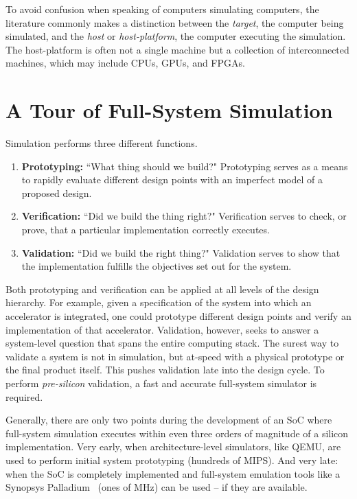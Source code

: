 To avoid confusion when speaking of computers simulating computers, the
literature commonly makes a distinction between the \emph{target}, the computer
being simulated, and the \emph{host} or \emph{host-platform}, the computer
executing the simulation. The host-platform is often not a single machine but
a collection of interconnected machines, which may include CPUs,
GPUs, and FPGAs.

\section{A Tour of Full-System Simulation}

Simulation performs three different functions.

\begin{enumerate}

    \item \textbf{Prototyping:} ``What thing should we
        build?" Prototyping serves as a means to rapidly evaluate different
        design points with an imperfect model of a proposed design.

    \item \textbf{Verification:} ``Did we build the thing right?" Verification
        serves to check, or prove, that a particular implementation
        correctly executes.

    \item \textbf{Validation:} ``Did we build the right thing?" Validation
        serves to show that the implementation fulfills the objectives set out
        for the system.

\end{enumerate}

Both prototyping and verification can be applied at all levels of the design
hierarchy.  For example, given a specification of the system into which an
accelerator is integrated, one could prototype different design points and
verify an implementation of that accelerator. Validation, however, seeks to
answer a system-level question that spans the entire computing stack.  The
surest way to validate a system is not in simulation, but at-speed with a
physical prototype or the final product itself. This pushes validation late
into the design cycle. To perform \emph{pre-silicon} validation, a fast and
accurate full-system simulator is required.

Generally, there are only two points during the development of an SoC where
full-system simulation executes within even three orders of magnitude of a
silicon implementation. Very early, when architecture-level simulators, like QEMU\cite{qemu}, are used
to perform initial system prototyping (hundreds of MIPS). And very late: when
the SoC is completely implemented and full-system emulation tools like a
Synopsys Palladium~\cite{palladium} (ones of MHz) can be used -- if they are
available.

